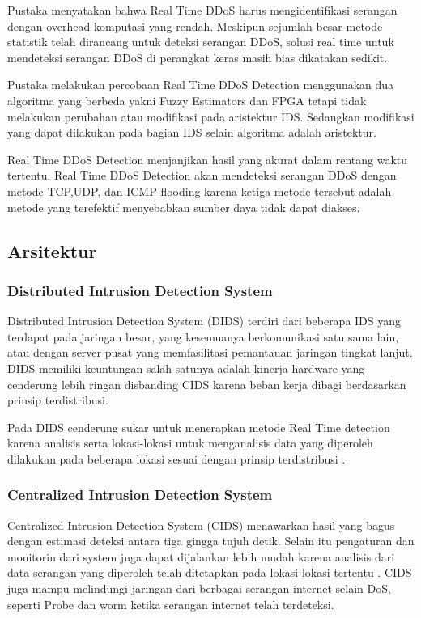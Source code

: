 Pustaka \cite{ddosfpga} menyatakan bahwa Real Time DDoS harus mengidentifikasi serangan dengan overhead komputasi yang rendah. Meskipun sejumlah besar metode statistik telah dirancang untuk deteksi serangan DDoS, solusi real time untuk mendeteksi serangan DDoS di perangkat keras masih bias dikatakan sedikit.

Pustaka \cite{ddosfuzzy}\cite{ddosfpga} melakukan percobaan Real Time DDoS Detection menggunakan dua algoritma yang berbeda yakni Fuzzy Estimators dan FPGA tetapi tidak melakukan perubahan atau modifikasi pada aristektur IDS. Sedangkan modifikasi yang dapat dilakukan pada bagian IDS selain algoritma adalah aristektur.

Real Time DDoS Detection menjanjikan hasil yang akurat dalam rentang waktu tertentu\cite{ddosfuzzy}. Real Time DDoS Detection akan mendeteksi serangan DDoS dengan metode TCP,UDP, dan ICMP flooding karena ketiga metode tersebut adalah metode yang terefektif menyebabkan sumber daya tidak dapat diakses\cite{ddosstat}.



\subsection{Arsitektur}
\subsubsection{Distributed Intrusion Detection System}

Distributed Intrusion Detection System (DIDS) terdiri dari beberapa IDS yang terdapat pada jaringan besar, yang kesemuanya berkomunikasi satu sama lain, atau dengan server pusat yang memfasilitasi pemantauan jaringan tingkat lanjut\cite{dids1}. DIDS memiliki keuntungan salah satunya adalah kinerja hardware yang cenderung lebih ringan disbanding CIDS karena beban kerja dibagi berdasarkan prinsip terdistribusi.

Pada DIDS cenderung sukar untuk menerapkan metode Real Time detection karena analisis serta lokasi-lokasi untuk menganalisis data yang diperoleh dilakukan pada beberapa lokasi sesuai dengan prinsip terdistribusi \cite{idssurvey}.


\subsubsection{Centralized Intrusion Detection System}

Centralized Intrusion Detection System (CIDS) menawarkan hasil yang bagus dengan estimasi deteksi antara tiga gingga tujuh detik\cite{cids1}. Selain itu pengaturan dan monitorin dari system juga dapat dijalankan lebih mudah karena analisis dari data serangan yang diperoleh telah ditetapkan pada lokasi-lokasi tertentu \cite{idssurvey}.  CIDS juga mampu melindungi jaringan dari berbagai serangan internet selain DoS, seperti Probe dan worm ketika serangan internet telah terdeteksi.

